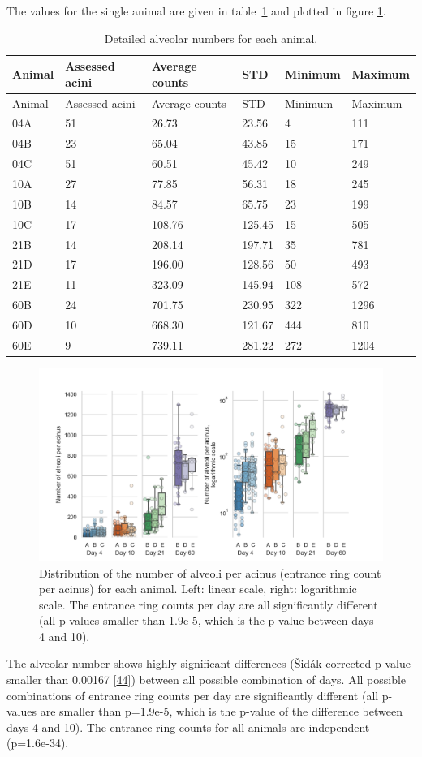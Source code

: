 \documentclass[
  american,
]{article}
\begin{document}
The values for the single animal are given in table~\ref{tbl:counts} and plotted in figure \ref{fig:02}.

\begin{longtable}[]{@{}llllll@{}}
\caption{Detailed alveolar numbers for each animal. \label{tbl:counts}}\tabularnewline
\toprule
Animal & Assessed acini & Average counts & STD & Minimum & Maximum\tabularnewline
\midrule
\endfirsthead
\toprule
Animal & Assessed acini & Average counts & STD & Minimum & Maximum\tabularnewline
\midrule
\endhead
04A & 51 & 26.73 & 23.56 & 4 & 111\tabularnewline
04B & 23 & 65.04 & 43.85 & 15 & 171\tabularnewline
04C & 51 & 60.51 & 45.42 & 10 & 249\tabularnewline
10A & 27 & 77.85 & 56.31 & 18 & 245\tabularnewline
10B & 14 & 84.57 & 65.75 & 23 & 199\tabularnewline
10C & 17 & 108.76 & 125.45 & 15 & 505\tabularnewline
21B & 14 & 208.14 & 197.71 & 35 & 781\tabularnewline
21D & 17 & 196.00 & 128.56 & 50 & 493\tabularnewline
21E & 11 & 323.09 & 145.94 & 108 & 572\tabularnewline
60B & 24 & 701.75 & 230.95 & 322 & 1296\tabularnewline
60D & 10 & 668.30 & 121.67 & 444 & 810\tabularnewline
60E & 9 & 739.11 & 281.22 & 272 & 1204\tabularnewline
\bottomrule
\end{longtable}

\begin{figure}
\hypertarget{fig:02}{%
\centering
\includegraphics{images/fig02.png}
\caption{Distribution of the number of alveoli per acinus (entrance ring count per acinus) for each animal.
Left: linear scale, right: logarithmic scale.
The entrance ring counts per day are all significantly different (all p-values smaller than 1.9e-5, which is the p-value between days 4 and 10).}\label{fig:02}
}
\end{figure}

The alveolar number shows highly significant differences (Šidák-corrected p-value smaller than 0.00167 {[}\protect\hyperlink{ref-GtCynqsI}{44}{]}) between all possible combination of days.
All possible combinations of entrance ring counts per day are significantly different (all p-values are smaller than p=1.9e-5, which is the p-value of the difference between days 4 and 10).
The entrance ring counts for all animals are independent (p=1.6e-34).
\end{document}
